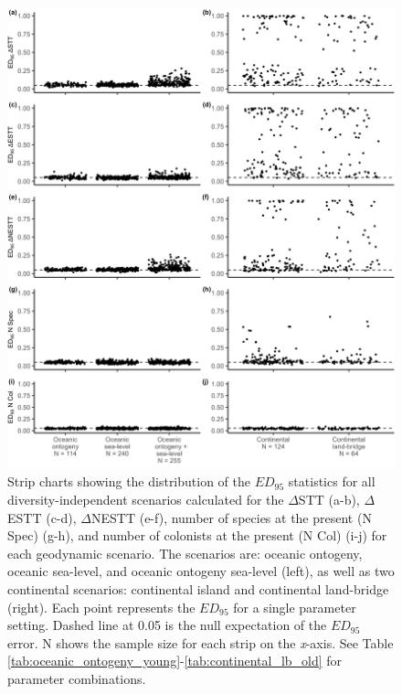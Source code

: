 \begin{figure}
    \centering
    \includegraphics[width=\textwidth]{JBI-21-0508_FigS6.png}
    \caption{Strip charts showing the distribution of the $ED_{95}$ statistics for all diversity-independent scenarios calculated for the $\Delta$STT (a-b), $\Delta$ESTT (c-d), $\Delta$NESTT (e-f), number of species at the present (N Spec) (g-h), and number of colonists at the present (N Col) (i-j) for each geodynamic scenario. The scenarios are: oceanic ontogeny, oceanic sea-level, and oceanic ontogeny sea-level (left), as well as two continental scenarios: continental island and continental land-bridge (right). Each point represents the $ED_{95}$ for a single parameter setting. Dashed line at 0.05 is the null expectation of the $ED_{95}$ error. N shows the sample size for each strip on the \textit{x}-axis. See Table \ref{tab:oceanic_ontogeny_young}-\ref{tab:continental_lb_old} for parameter combinations.}
    \label{fig:facet_scenario_di}
\end{figure}

